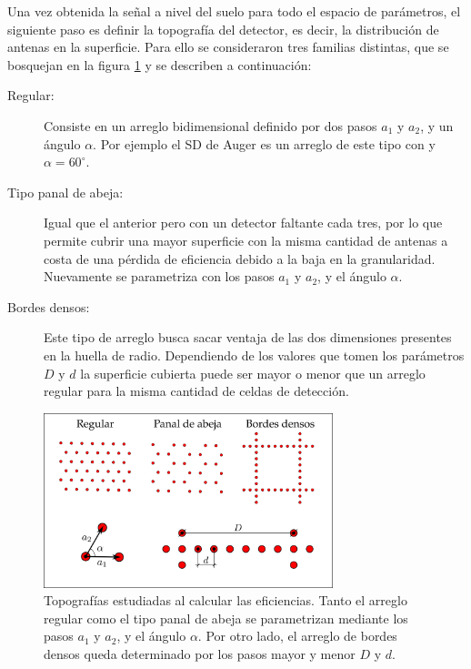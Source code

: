 	Una vez obtenida la se\~nal a nivel del suelo para todo el espacio de par\'ametros, el siguiente paso es definir la topograf\'ia del detector, es decir, la distribuci\'on de antenas en la superficie.
	Para ello se consideraron tres familias distintas, que se bosquejan en la figura \ref{fig:topoRadio} y se describen a continuaci\'on:
	\begin{description}
	 \item[Regular:] Consiste en un arreglo bidimensional definido por dos pasos $a_1$ y $a_2$, y un \'angulo $\alpha$. Por ejemplo el SD de Auger es un arreglo de este tipo con  y $\alpha=60^\circ$.
	 \item[Tipo panal de abeja:] Igual que el anterior pero con un detector faltante cada tres, por lo que permite cubrir una mayor superficie con la misma cantidad de antenas a costa de una p\'erdida de eficiencia debido a la baja en la granularidad. Nuevamente se parametriza con los pasos $a_1$ y $a_2$, y el \'angulo $\alpha$. 
	 \item[Bordes densos:] Este tipo de arreglo busca sacar ventaja de las dos dimensiones presentes en la huella de radio. Dependiendo de los valores que tomen los par\'ametros $D$ y $d$ la superficie cubierta puede ser mayor o menor que un arreglo regular para la misma cantidad de celdas de detecci\'on.  
	\end{description}
	\begin{figure}[h!]
		\begin{center}
			\includegraphics[width=0.75\textwidth]{fig/resultadosRadio/topografia}
			\caption{\label{fig:topoRadio} Topograf\'ias estudiadas al calcular las eficiencias. Tanto el arreglo regular como el tipo panal de abeja se parametrizan mediante los pasos $a_1$ y $a_2$, y el \'angulo $\alpha$. Por otro lado, el arreglo de bordes densos queda determinado por los pasos mayor y menor $D$ y $d$.
			}
		\end{center}
	\end{figure}
	
